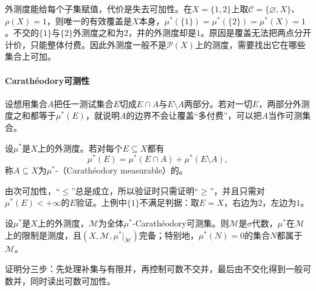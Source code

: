 外测度能给每个子集赋值，代价是失去可加性。在$X=\{1,2\}$上取$\mathcal C=\{\varnothing,X\}$、$\rho(X)=1$，则唯一的有效覆盖是$X$本身，$\mu^*(\{1\})=\mu^*(\{2\})=\mu^*(X)=1$。不交的$\{1\}$与$\{2\}$外测度之和为$2$，并的外测度却是$1$。原因是覆盖无法把两点分开计价，只能整体付费。因此外测度一般不是$\mathcal P(X)$上的测度，需要找出它在哪些集合上可加。

\paragraph{Carathéodory可测性}
设想用集合$A$把任一测试集合$E$切成$E\cap A$与$E\setminus A$两部分。若对一切$E$，两部分外测度之和都等于$\mu^*(E)$，就说明$A$的边界不会让覆盖“多付费”，可以把$A$当作可测集合。

\begin{definition}[Carathéodory可测]
\label{def:measure-caratheodory-measurable}
设$\mu^*$是$X$上的外测度。若对每个$E\subseteq X$都有
\[
 \mu^*(E)=\mu^*(E\cap A)+\mu^*(E\setminus A),
\]
称$A\subseteq X$为$\mu^*$-（Carathéodory measurable）的。
\end{definition}

由次可加性，“$\le$”总是成立，所以验证时只需证明“$\ge$”，并且只需对$\mu^*(E)<+\infty$的$E$验证。上例中$\{1\}$不满足判据：取$E=X$，右边为$2$，左边为$1$。

\begin{theorem}[Carathéodory定理]
\label{thm:measure-caratheodory-criterion}
设$\mu^*$是$X$上的外测度，$\mathcal M$为全体$\mu^*$-Carathéodory可测集。则$\mathcal M$是$\sigma$代数，$\mu^*$在$\mathcal M$上的限制是测度，且$(X,\mathcal M,\mu^*|_{\mathcal M})$完备；特别地，$\mu^*(N)=0$的集合$N$都属于$\mathcal M$。
\end{theorem}

证明分三步：先处理补集与有限并，再控制可数不交并，最后由不交化得到一般可数并，同时读出可数可加性。

